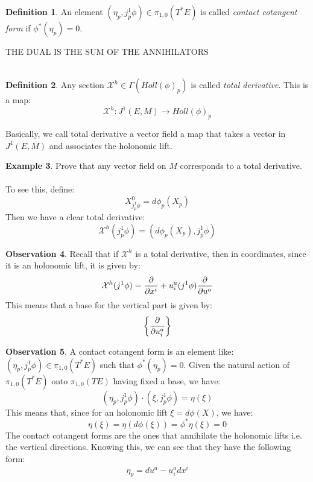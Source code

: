 \documentclass[12pt,a4paper]{report}
\theoremstyle{definition}
\newtheorem{Def}{Definition}[chapter]
\theoremstyle{Theorem}
\theoremstyle{definition}
\newtheorem{Ex}[Def]{Example}
\theoremstyle{definition}
\newtheorem{Obs}[Def]{Observation}
\begin{document}
	\begin{Def}
		An element $(\eta_p,j^1_p\phi)\in \pi_{1,0}(T^*E)$ is called \textit{contact cotangent form} if $\phi^*(\eta_p)=0$.
	\end{Def}
	THE DUAL IS THE SUM OF THE ANNIHILATORS\\\\
	\begin{Def}
		Any section $\mathcal{X}^h\in\Gamma(Holl(\phi)_p)$ is called \textit{total derivative}.
		This is a map:
		$$\mathcal{X}^h:J^1(E,M)\rightarrow Holl(\phi)_p$$
	\end{Def}
	Basically, we call total derivative a vector field a map that takes a vector in $J^1(E,M)$ and associates the holonomic lift.
	\begin{Ex}
		Prove that any vector field on $M$ corresponds to a total derivative.\\
		\\
		To see this, define:
		$$X^0_{j^1_p\phi}=d\phi_p(X_p)$$
		Then we have a clear total derivative:
		$$\mathcal{X}^h(j^1_p\phi)=(d\phi_p(X_p),j^1_p\phi)$$
	\end{Ex}
	\begin{Obs}
		Recall that if $\mathcal{X}^h$ is a total derivative, then in coordinates, since it is an holonomic lift, it is given by:
		$$\mathcal{X}^h(j^1\phi)={\partial\over \partial x^i}+u_i^a(j^1\phi){\partial\over \partial u^a}$$
		This means that a base for the vertical part is given by:
		$$\bigg\{{\partial\over\partial u^a_i}\bigg\}$$
	\end{Obs}
	\begin{Obs}
		A contact cotangent form is an element like: $(\eta_p,j^1_p\phi)\in \pi_{1,0}(T^*E)$ such that $\phi^*(\eta_p)=0$. Given the natural action of $\pi_{1,0}(T^*E)$ onto $\pi_{1,0}(TE)$ having fixed a base, we have:
		$$(\eta_p,j^1_p\phi)\cdot (\xi,j^1_p\phi)=\eta(\xi)$$
		This means that, since for an holonomic lift $\xi=d\phi(X)$, we have:
		$$\eta(\xi)=\eta(d\phi(\xi))=\phi^*\eta(\xi)=0$$
		The contact cotangent forms are the ones that annihilate the holonomic lifts i.e. the vertical directions. Knowing this, we can see that they have the following form:
		$$\eta_p=du^a-u^a_idx^i$$
	\end{Obs}
\end{document}
